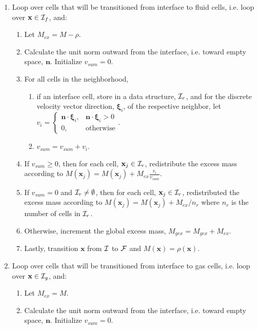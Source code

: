 \documentclass[pdftex,ms]{pittetd}
\newcommand{\pos}{\mathbf{x}}
\newcommand{\pvel}{\boldsymbol{\xi}}
\begin{document}
\begin{enumerate}
\begin{enumerate}
\begin{enumerate}
		\end{enumerate}
	\end{enumerate}
\item \label{enum:rloop-fluid} Loop over cells that will be transitioned from interface to fluid cells, i.e. loop over $\pos \in \iset_f$, and:
\begin{enumerate}
	\item Let $M_{ex} = M - \rho$.
	\item Calculate the unit norm outward from the interface, i.e. toward empty space, $\mathbf{n}$.
	Initialize $v_{sum} = 0$.
	\item For all cells in the neighborhood,
	\begin{enumerate}
		\item if an interface cell, store in a data structure, $\mathcal{I}_{r}$, and for the discrete velocity vector direction, $\pvel_i$, of the respective neighbor, let $v_i = \begin{cases}
					\mathbf{n} \cdot \pvel_i, & \mathbf{n} \cdot \pvel_i > 0 \\
					0, & \text{otherwise}
				\end{cases}$.
		\item $v_{sum} = v_{sum} + v_i$.
	\end{enumerate}
	\item If $v_{sum} \ge 0$, then for each cell, $\pos_j \in \iset_r$, redistribute the excess mass according to $M(\pos_j) = M(\pos_j) + M_{ex} \frac{v_i}{v_{sum}}$. \label{enum:redist-dop-f}
	\item \label{enum:redist-neighbors-f} If $v_{sum} = 0$ and $\mathcal{I}_r \neq \emptyset$, then for each cell, $\pos_j \in \iset_r$, redistributed the excess mass according to $M(\pos_j) = M(\pos_j) +  M_{ex} / n_r$ where $n_r$ is the number of cells in $\mathcal{I}_r$.
	\item Otherwise, increment the global excess mass, $M_{gex} = M_{gex} + M_{ex}$.
	\item Lastly, transition $\pos$ from $\mathcal{I}$ to $\mathcal{F}$ and $M(\pos) = \rho(\pos)$.
\end{enumerate}
\item \label{enum:rloop-gas} Loop over cells that will be transitioned from interface to gas cells, i.e. loop over $\pos \in \iset_g$, and:
\begin{enumerate}
	\item Let $M_{ex} = M$.
	\item Calculate the unit norm outward from the interface, i.e. toward empty space, $\mathbf{n}$.
	Initialize $v_{sum} = 0$.

\end{enumerate}
\end{enumerate}
\end{document}
